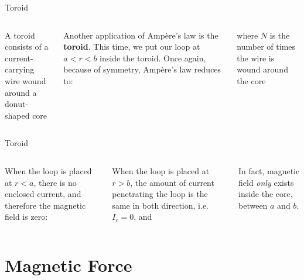 \documentclass[12pt,aspectratio=169]{beamer}
\begin{document}
\begin{frame}{Toroid}
  \begin{columns}

    {\scriptsize A toroid consists of a current-\\
      carrying wire wound around a donut-shaped core \par}
    
    Another application of Amp\`{e}re's law is the \textbf{toroid}. This time,
    we put our loop at $a<r<b$ inside the toroid. Once again, because of
    symmetry, Amp\`{e}re's law reduces to:


    \vspace{-.15in}where $N$ is the number of times the wire is wound around
    the core
    
  \end{columns}
\end{frame}


\begin{frame}{Toroid}
  \begin{columns}

    When the loop is placed at $r<a$, there is no enclosed
    current, and therefore the magnetic field is zero:


    \vspace{-.2in}When the loop is placed at $r>b$, the amount of current
    penetrating the loop is the same in both direction, i.e.\ $I_c=0$, and

    
    \vspace{-.1in}In fact, magnetic field \emph{only} exists inside the core,
    between $a$ and $b$.
  \end{columns}
\end{frame}




\section{Magnetic Force}
\end{document}
